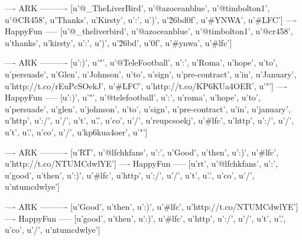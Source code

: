 ---- ARK ----------
[u'@_TheLiverBird', u'@azoceanblue', u'@timbolton1', u'@CR458', u'Thanks', u'Kirsty', u':', u')', u'\u26bd\ufe0f', u'#YNWA', u'#LFC']
---- HappyFun -----
[u'@_theliverbird', u'@azoceanblue', u'@timbolton1', u'@cr458', u'thanks', u'kirsty', u':', u')', u'\u26bd', u'\ufe0f', u'#ynwa', u'#lfc']


---- ARK ----------
[u':)', u'"', u'@TeleFootball', u':', u'Roma', u'hope', u'to', u'persuade', u'Glen', u'Johnson', u'to', u'sign', u'pre-contract', u'in', u'January', u'http://t.co/rEuPcSOekJ', u'#LFC', u'http://t.co/KP6KUa4OER', u'"']
---- HappyFun -----
[u':)', u'"', u'@telefootball', u':', u'roma', u'hope', u'to', u'persuade', u'glen', u'johnson', u'to', u'sign', u'pre-contract', u'in', u'january', u'http', u':/', u'/', u't', u'.', u'co', u'/', u'reupcsoekj', u'#lfc', u'http', u':/', u'/', u't', u'.', u'co', u'/', u'kp6kua4oer', u'"']


---- ARK ----------
[u'RT', u'@lfchkfans', u':', u'Good', u'then', u':)', u'#lfc', u'http://t.co/NTUMCdwlYE']
---- HappyFun -----
[u'rt', u'@lfchkfans', u':', u'good', u'then', u':)', u'#lfc', u'http', u':/', u'/', u't', u'.', u'co', u'/', u'ntumcdwlye']


---- ARK ----------
[u'Good', u'then', u':)', u'#lfc', u'http://t.co/NTUMCdwlYE']
---- HappyFun -----
[u'good', u'then', u':)', u'#lfc', u'http', u':/', u'/', u't', u'.', u'co', u'/', u'ntumcdwlye']
